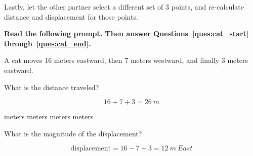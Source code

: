\documentclass[]{exam}
\begin{document}
\begin{questions}
\begin{questions}
Lastly, let the other partner select a different set of 3 points, and re-calculate distance and displacement for those points. 

\clearpage
\begin{EnvUplevel}
\textbf{Read the following prompt. Then answer Questions~\ref{ques:cat_start} through~\ref{ques:cat_end}.} 
\end{EnvUplevel}
\vspace{-0.5em}

\begin{EnvUplevel}
A cat moves 16 meters eastward, then 7 meters westward, and finally 3 meters eastward.
\end{EnvUplevel}

\begin{figure}[h!]
    \centering
\end{figure}

\question \label{ques:cat_start}
What is the distance traveled?

\begin{solution}
\begin{equation*}
    16 + 7 + 3 = \SI{26}{m}
\end{equation*}
\end{solution}

\begin{choices}
 meters
 meters
 meters
 meters
\end{choices}

\question
What is the magnitude of the displacement?

\begin{solution}
\begin{equation*}
  \mathrm{displacement} = 16 - 7 + 3 = \SI{12}{m \ East}  
\end{equation*}


\end{solution}
\end{questions}
\end{questions}
\end{document}
